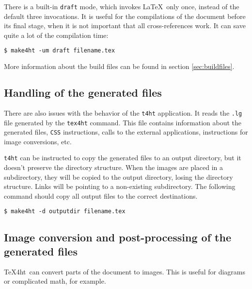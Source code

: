 There is a built-in \texttt{draft} mode, which invokes \LaTeX~only once,
instead of the default three invocations. It is useful for the
compilations of the document before its final stage, when it is not
important that all cross-references work. It can save quite a lot of the
compilation time:

\begin{verbatim}
$ make4ht -um draft filename.tex
\end{verbatim}

More information about the build files can be found in section
\ref{sec:buildfiles}.

\hypertarget{handling-of-the-generated-files}{%
\subsection{Handling of the generated
files}\label{handling-of-the-generated-files}}

\label{sec:output-dir}

There are also issues with the behavior of the \texttt{t4ht}
application. It reads the \texttt{.lg} file generated by the
\texttt{tex4ht} command. This file contains information about the
generated files, \texttt{CSS} instructions, calls to the external
applications, instructions for image conversions, etc.

\texttt{t4ht} can be instructed to copy the generated files to an output
directory, but it doesn't preserve the directory structure. When the
images are placed in a\\
subdirectory, they will be copied to the output directory, losing the
directory structure. Links will be pointing to a non-existing
subdirectory. The following command should copy all output files to the
correct destinations.

\begin{verbatim}
$ make4ht -d outputdir filename.tex
\end{verbatim}

\hypertarget{image-conversion-and-post-processing-of-the-generated-files}{%
\subsection{Image conversion and post-processing of the generated
files}\label{image-conversion-and-post-processing-of-the-generated-files}}

\TeX4ht~can convert parts of the document to images. This is useful for
diagrams or complicated math, for example.

